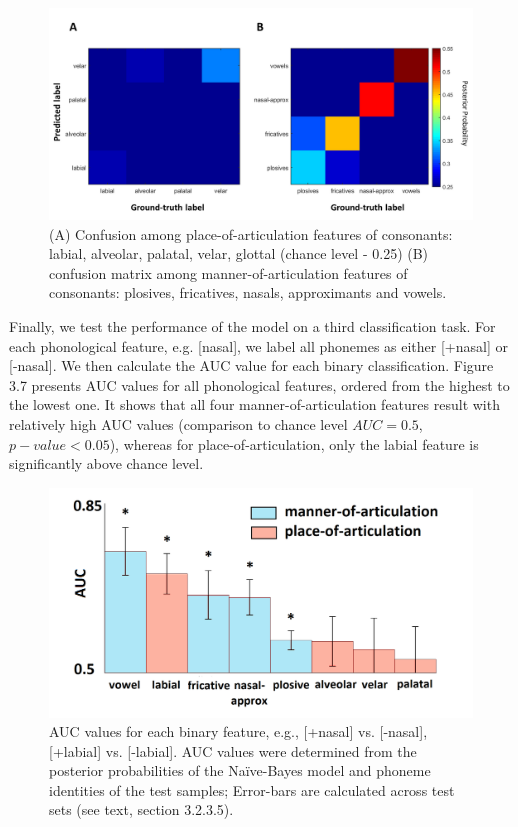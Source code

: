 \begin{figure}[h]
\vspace{.3in}
\includegraphics[width=\linewidth]{Figures/Ch3/confusion_matrices.png}
\caption{(A) Confusion among place-of-articulation features of consonants: labial, alveolar, palatal, velar, glottal (chance level - 0.25) (B) confusion matrix among manner-of-articulation features of consonants: plosives, fricatives, nasals, approximants and vowels.}
\end{figure}

Finally, we test the performance of the model on a third classification task. For each phonological feature, e.g. [nasal], we label all phonemes as either [+nasal] or [-nasal]. We then calculate the AUC value for each binary classification. Figure 3.7 presents AUC values for all phonological features, ordered from the highest to the lowest one. It shows that all four manner-of-articulation features result with relatively high AUC values (comparison to chance level $AUC = 0.5$, $p-value<0.05$), whereas for place-of-articulation, only the labial feature is significantly above chance level.

\begin{figure}[h]
\vspace{.3in}
\includegraphics[width=\linewidth]{Figures/Ch3/AUC_bars.png}
\caption{AUC values for each binary feature, e.g., [+nasal] vs. [-nasal], [+labial] vs. [-labial]. AUC values were determined from the posterior probabilities of the Na\"{i}ve-Bayes model and phoneme identities of the test samples; Error-bars are calculated across test sets (see text, section 3.2.3.5).}
\end{figure}

